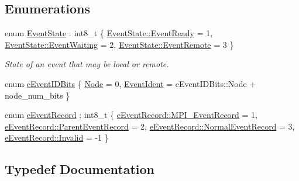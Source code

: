 \subsection*{Enumerations}
\begin{DoxyCompactItemize}
\item 
enum \hyperlink{namespacevt_1_1event_a787aca6361696d96d817a639195c429c}{Event\+State} \+: int8\+\_\+t \{ \hyperlink{namespacevt_1_1event_a787aca6361696d96d817a639195c429cac39388d25cc07031a0e9939837999e92}{Event\+State\+::\+Event\+Ready} = 1, 
\hyperlink{namespacevt_1_1event_a787aca6361696d96d817a639195c429ca9fa9370ca123bee33d77fccd7ee8c459}{Event\+State\+::\+Event\+Waiting} = 2, 
\hyperlink{namespacevt_1_1event_a787aca6361696d96d817a639195c429ca6c1cd1c5d55dc05e2b16a4f5f2d2dadd}{Event\+State\+::\+Event\+Remote} = 3
 \}\begin{DoxyCompactList}\small\item\em State of an event that may be local or remote. \end{DoxyCompactList}
\item 
enum \hyperlink{namespacevt_1_1event_ad563011dc9e3e01042df27d00092aceb}{e\+Event\+I\+D\+Bits} \{ \hyperlink{namespacevt_1_1event_ad563011dc9e3e01042df27d00092acebadcc2ad1a42eece610bebe64d6c0128d8}{Node} = 0, 
\hyperlink{namespacevt_1_1event_ad563011dc9e3e01042df27d00092aceba2afe9027cb72d9816ad052b1614fbc7f}{Event\+Ident} = e\+Event\+I\+D\+Bits\+:\+:Node + node\+\_\+num\+\_\+bits
 \}
\item 
enum \hyperlink{namespacevt_1_1event_a1ea9fec44d101bf40b8fd786d44ebed9}{e\+Event\+Record} \+: int8\+\_\+t \{ \hyperlink{namespacevt_1_1event_a1ea9fec44d101bf40b8fd786d44ebed9a4d5894349a7d2598349be83e506c5450}{e\+Event\+Record\+::\+M\+P\+I\+\_\+\+Event\+Record} = 1, 
\hyperlink{namespacevt_1_1event_a1ea9fec44d101bf40b8fd786d44ebed9ae0c752eac6805bd001b4aa4912771c14}{e\+Event\+Record\+::\+Parent\+Event\+Record} = 2, 
\hyperlink{namespacevt_1_1event_a1ea9fec44d101bf40b8fd786d44ebed9abd225f70b1ce49f73ff00c2bdf3392a2}{e\+Event\+Record\+::\+Normal\+Event\+Record} = 3, 
\hyperlink{namespacevt_1_1event_a1ea9fec44d101bf40b8fd786d44ebed9a4bbb8f967da6d1a610596d7257179c2b}{e\+Event\+Record\+::\+Invalid} = -\/1
 \}
\end{DoxyCompactItemize}


\subsection{Typedef Documentation}
\mbox{\label{namespacevt_1_1event_a0893245b7a220f3fe6951382e3038afa}} 
